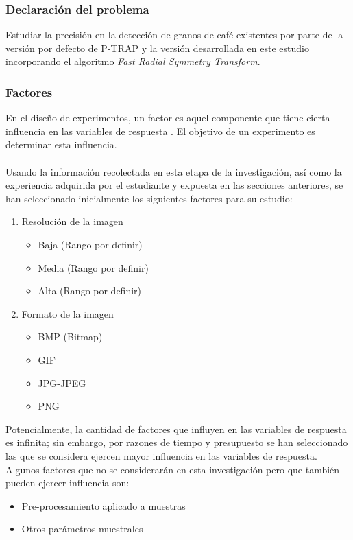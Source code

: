 \subsubsection{Declaraci\'on del problema}
Estudiar la precisi\'on en la detecci\'on de granos de caf\'e existentes por parte de la versi\'on por defecto de P-TRAP\cite{ptrap} y la versi\'on desarrollada en este estudio incorporando el algoritmo \textit{Fast Radial Symmetry Transform}\cite{loyzelinsky}.
\subsubsection{Factores}
En el dise\~no de experimentos, un factor es aquel componente que tiene cierta
influencia en las variables de respuesta \cite{montgomeryx}. El objetivo de un experimento es determinar esta influencia.
\\\\
Usando la informaci\'on recolectada en esta etapa de la investigaci\'on, as\'i como la experiencia adquirida por el estudiante y expuesta en las secciones anteriores, se han seleccionado inicialmente los siguientes factores para su estudio:
\begin{enumerate}
    \item Resoluci\'on de la imagen
	    \begin{itemize}
		    \item Baja (Rango por definir)
		    \item Media (Rango por definir)
		    \item Alta (Rango por definir)
	    \end{itemize}
    \item Formato de la imagen
	    \begin{itemize}
	        \item BMP (Bitmap)
	        \item GIF
	        \item JPG-JPEG
	        \item PNG
	    \end{itemize}
\end{enumerate}
Potencialmente, la cantidad de factores que influyen en las variables de respuesta es infinita; sin embargo, por razones de tiempo y presupuesto se han seleccionado las que se considera ejercen mayor influencia en las variables de respuesta. Algunos factores que no se considerar\'an en esta investigaci\'on
pero que tambi\'en pueden ejercer influencia son:
\begin{itemize}
\item Pre-procesamiento aplicado a muestras
\item Otros par\'ametros muestrales
\end{itemize}
